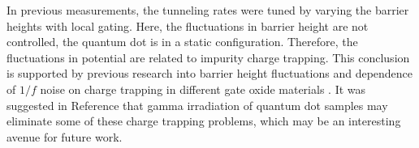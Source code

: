 In previous measurements, the tunneling rates were tuned by varying the barrier heights with local gating. Here, the fluctuations in barrier height are not controlled, the quantum dot is in a static configuration. Therefore, the fluctuations in potential are related to impurity charge trapping. This conclusion is supported by previous research into barrier height fluctuations \cite{Jung2004} and dependence of $1/f$ noise on charge trapping in different gate oxide materials \cite{Sydoruk2014}. It was suggested in Reference \cite{Sydoruk2014} that gamma irradiation of quantum dot samples may eliminate some of these charge trapping problems, which may be an interesting avenue for future work.



%
%
%
%
%
%
